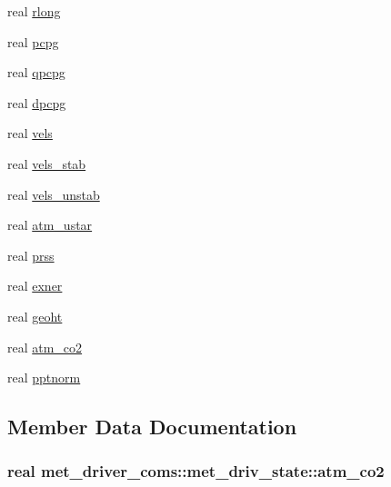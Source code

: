 \begin{DoxyCompactItemize}
\item 
real \hyperlink{structmet__driver__coms_1_1met__driv__state_a97b5a0d3e0d91625cc9f7ce5466250d3}{rlong}
\item 
real \hyperlink{structmet__driver__coms_1_1met__driv__state_a6743d2024c42fd16c0bb66a27aee7dab}{pcpg}
\item 
real \hyperlink{structmet__driver__coms_1_1met__driv__state_af1d92bf111e5ecc9504425bb9b686510}{qpcpg}
\item 
real \hyperlink{structmet__driver__coms_1_1met__driv__state_a89b39d6539ca58bb0d67f72f0a9cca3a}{dpcpg}
\item 
real \hyperlink{structmet__driver__coms_1_1met__driv__state_a2f1468290cf4c5191ff3305516f403b4}{vels}
\item 
real \hyperlink{structmet__driver__coms_1_1met__driv__state_aea2f12c370f025cc899515c9043dbdb9}{vels\+\_\+stab}
\item 
real \hyperlink{structmet__driver__coms_1_1met__driv__state_a5237ae89349cfee1060065ed728b8bb1}{vels\+\_\+unstab}
\item 
real \hyperlink{structmet__driver__coms_1_1met__driv__state_a2ae1bf578a610d259dc6312cfe52bd6c}{atm\+\_\+ustar}
\item 
real \hyperlink{structmet__driver__coms_1_1met__driv__state_a06b520bcea3424567bf379011fe40e73}{prss}
\item 
real \hyperlink{structmet__driver__coms_1_1met__driv__state_ac473e9c3fd6e4d935a49ba24ef15d26b}{exner}
\item 
real \hyperlink{structmet__driver__coms_1_1met__driv__state_a511aa6dfb471f836dbe7e0e0e6124d3e}{geoht}
\item 
real \hyperlink{structmet__driver__coms_1_1met__driv__state_ab05d25010c91731e9503dbd6a618dd95}{atm\+\_\+co2}
\item 
real \hyperlink{structmet__driver__coms_1_1met__driv__state_a940ce4816665900d5de54bd07c5b87ec}{pptnorm}
\end{DoxyCompactItemize}


\subsection{Member Data Documentation}
\subsubsection[{\texorpdfstring{atm\+\_\+co2}{atm_co2}}]{\setlength{\rightskip}{0pt plus 5cm}real met\+\_\+driver\+\_\+coms\+::met\+\_\+driv\+\_\+state\+::atm\+\_\+co2}\hypertarget{structmet__driver__coms_1_1met__driv__state_ab05d25010c91731e9503dbd6a618dd95}{}\label{structmet__driver__coms_1_1met__driv__state_ab05d25010c91731e9503dbd6a618dd95}
